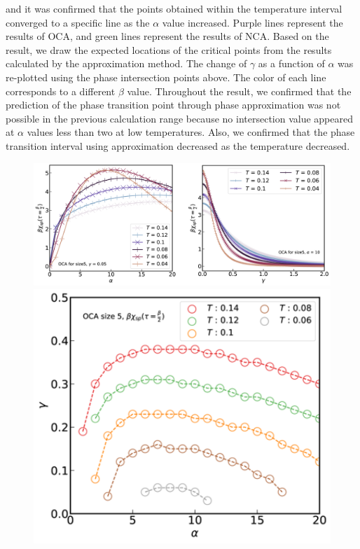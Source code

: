 \documentclass{article}[12pt]
\begin{document}
\begin{spacing}{1.5}
and it was confirmed that the points obtained within the temperature interval converged to a specific line as the $\alpha$ value increased. 
Purple lines represent the results of OCA, and green lines represent the results of NCA. 
Based on the result, we draw the expected locations of the critical points from the results calculated by the approximation method. 
The change of $\gamma$ as a function of $\alpha$ was re-plotted using the phase intersection points above. 
The color of each line corresponds to a different $\beta$ value.
Throughout the result, we confirmed that the prediction of the phase transition point through phase approximation was not possible 
in the previous calculation range because no intersection value appeared at $\alpha$ values less than two at low temperatures. 
Also, we confirmed that the phase transition interval using approximation decreased as the temperature decreased.
\pagebreak
\begin{figure}[htbp]
  \centerline{\includegraphics[width=15cm]{TexFigure/4/4_4_04_crossing.png}}
  \centerline{\includegraphics[width=12cm]{TexFigure/4/4_4_05_templine.png}}

\end{figure}
\end{spacing}
\end{document}
